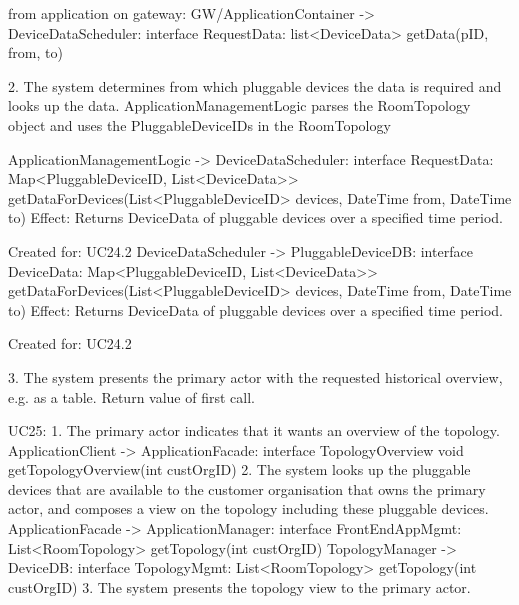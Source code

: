                 from application on gateway:
                    GW/ApplicationContainer -> DeviceDataScheduler: interface RequestData: list<DeviceData> getData(pID, from, to)

            2. The system determines from which pluggable devices the data is required and looks up the data.
                ApplicationManagementLogic parses the RoomTopology object and uses the PluggableDeviceIDs in the RoomTopology

                    ApplicationManagementLogic -> DeviceDataScheduler: interface RequestData: Map<PluggableDeviceID, List<DeviceData>> getDataForDevices(List<PluggableDeviceID> devices, DateTime from, DateTime to)
                        Effect: Returns DeviceData of pluggable devices over a specified time period.
                        \item Created for: UC24.2
                    DeviceDataScheduler -> PluggableDeviceDB: interface DeviceData: Map<PluggableDeviceID, List<DeviceData>> getDataForDevices(List<PluggableDeviceID> devices, DateTime from, DateTime to)
                        Effect: Returns DeviceData of pluggable devices over a specified time period.
                        \item Created for: UC24.2

            3. The system presents the primary actor with the requested historical overview, e.g. as a table.
                Return value of first call.

        UC25:
            1. The primary actor indicates that it wants an overview of the topology.
                ApplicationClient -> ApplicationFacade: interface TopologyOverview
                                                               void getTopologyOverview(int custOrgID)
            2. The system looks up the pluggable devices that are available to the customer organisation
           that owns the primary actor, and composes a view on   the topology including these pluggable devices.
                ApplicationFacade -> ApplicationManager: interface FrontEndAppMgmt: List<RoomTopology> getTopology(int custOrgID)
                TopologyManager -> DeviceDB: interface TopologyMgmt: List<RoomTopology> getTopology(int custOrgID)
            3. The system presents the topology view to the primary actor.

